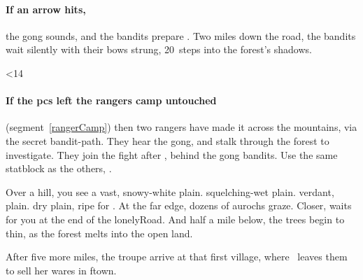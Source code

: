\documentclass[10pt,twoside]{book}
\begin{document}
\paragraph{If an arrow hits,}
the gong sounds, and the bandits prepare .
Two miles down the road, the bandits wait silently with their \glspl{bow} strung, 20~\glspl{step} into the forest's shadows.

\ifnum\thepage<14
  \paragraph{If the \glspl{pc} left the \glspl{ranger} camp untouched}
  (\gls{segment}~\vref{rangerCamp})
  then two \glspl{ranger} have made it across the mountains, via the secret bandit-path.
  They hear the gong, and stalk through the forest to investigate.
  They join the fight after , behind the gong bandits.
  Use the same \gls{statblock} as the others, .
\fi

\bigLine

\begin{boxtext}[]
  Over a hill, you see a vast, 
  \ifcase\thetemperature%
    snowy-white plain.
  \or%
    squelching-wet plain.
  \or%
    verdant, plain.
  \else%
    dry plain, ripe for .
  \fi%
  At the far edge, dozens of aurochs graze.
  Closer,  waits for you at the end of the \gls{lonelyRoad}.
  And half a mile below, the trees begin to thin, as the forest melts into the open land.
\end{boxtext}

After five more miles, the troupe arrive at that first \gls{village}, where \marketFence\ leaves them to sell her wares in \gls{ftown}.
\end{document}
